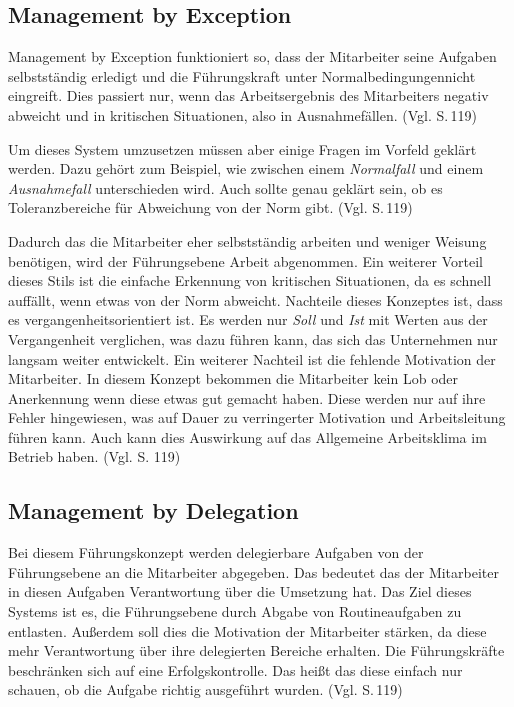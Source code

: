     \subsection{Management by Exception} \label{Exception}
        Management by Exception funktioniert so, dass der Mitarbeiter seine Aufgaben selbstständig erledigt und die 
        Führungskraft unter \as Normalbedingungen\adl nicht eingreift. Dies passiert nur, wenn das Arbeitsergebnis des
        Mitarbeiters negativ abweicht und in \as kritischen Situationen\adl, also in Ausnahmefällen. 
        (Vgl. \cite{Woehe2020} S.\,119)

        Um dieses System umzusetzen müssen aber einige Fragen im Vorfeld geklärt werden. Dazu gehört zum Beispiel, wie 
        zwischen einem \emph{Normalfall} und einem \emph{Ausnahmefall} unterschieden wird. Auch sollte genau geklärt
        sein, ob es Toleranzbereiche für Abweichung von der Norm gibt. (Vgl. \cite{Woehe2020} S.\,119)

        Dadurch das die Mitarbeiter eher selbstständig arbeiten und weniger Weisung benötigen, wird der Führungsebene
        Arbeit abgenommen. Ein weiterer Vorteil dieses Stils ist die einfache Erkennung von kritischen Situationen, da 
        es schnell auffällt, wenn etwas von der Norm abweicht. Nachteile dieses Konzeptes ist, dass es 
        vergangenheitsorientiert ist. Es werden nur \emph{Soll} und \emph{Ist} mit Werten aus der Vergangenheit 
        verglichen, was dazu führen kann, das sich das Unternehmen nur langsam weiter entwickelt. Ein weiterer Nachteil
        ist die fehlende Motivation der Mitarbeiter. In diesem Konzept bekommen die Mitarbeiter kein Lob oder 
        Anerkennung wenn diese etwas gut gemacht haben. Diese werden nur auf ihre Fehler hingewiesen, was auf Dauer zu
        verringerter Motivation und Arbeitsleitung führen kann. Auch kann dies Auswirkung auf das Allgemeine Arbeitsklima
        im Betrieb haben. (Vgl. \cite{Woehe2020} S.\,\,119)

    \subsection{Management by Delegation} \label{Delegation}
        Bei diesem Führungskonzept werden delegierbare Aufgaben von der Führungsebene an die Mitarbeiter abgegeben. Das
        bedeutet das der Mitarbeiter in diesen Aufgaben Verantwortung über die Umsetzung hat. Das Ziel dieses Systems
        ist es, die Führungsebene durch Abgabe von Routineaufgaben zu entlasten. Außerdem soll dies die Motivation der
        Mitarbeiter stärken, da diese mehr Verantwortung über ihre delegierten Bereiche erhalten. Die Führungskräfte 
        beschränken sich auf eine Erfolgskontrolle. Das heißt das diese einfach nur schauen, ob die Aufgabe richtig 
        ausgeführt wurden. (Vgl. \cite{Woehe2020} S.\,119)

